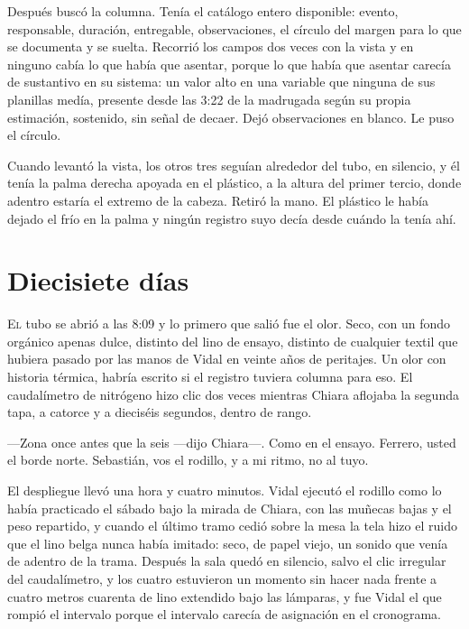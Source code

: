 Después buscó la columna. Tenía el catálogo entero disponible: evento, responsable, duración, entregable, observaciones, el círculo del margen para lo que se documenta y se suelta. Recorrió los campos dos veces con la vista y en ninguno cabía lo que había que asentar, porque lo que había que asentar carecía de sustantivo en su sistema: un valor alto en una variable que ninguna de sus planillas medía, presente desde las 3:22 de la madrugada según su propia estimación, sostenido, sin señal de decaer. Dejó observaciones en blanco. Le puso el círculo.

Cuando levantó la vista, los otros tres seguían alrededor del tubo, en silencio, y él tenía la palma derecha apoyada en el plástico, a la altura del primer tercio, donde adentro estaría el extremo de la cabeza. Retiró la mano. El plástico le había dejado el frío en la palma y ningún registro suyo decía desde cuándo la tenía ahí.

\clearpage

\chapter{Diecisiete días}

\lettrine[lines=2, lhang=0.1, nindent=0.2em]{E}{l} tubo se abrió a las 8:09 y lo primero que salió fue el olor. Seco, con un fondo orgánico apenas dulce, distinto del lino de ensayo, distinto de cualquier textil que hubiera pasado por las manos de Vidal en veinte años de peritajes. Un olor con historia térmica, habría escrito si el registro tuviera columna para eso. El caudalímetro de nitrógeno hizo clic dos veces mientras Chiara aflojaba la segunda tapa, a catorce y a dieciséis segundos, dentro de rango.


---Zona once antes que la seis ---dijo Chiara---. Como en el ensayo. Ferrero, usted el borde norte. Sebastián, vos el rodillo, y a mi ritmo, no al tuyo.

El despliegue llevó una hora y cuatro minutos. Vidal ejecutó el rodillo como lo había practicado el sábado bajo la mirada de Chiara, con las muñecas bajas y el peso repartido, y cuando el último tramo cedió sobre la mesa la tela hizo el ruido que el lino belga nunca había imitado: seco, de papel viejo, un sonido que venía de adentro de la trama. Después la sala quedó en silencio, salvo el clic irregular del caudalímetro, y los cuatro estuvieron un momento sin hacer nada frente a cuatro metros cuarenta de lino extendido bajo las lámparas, y fue Vidal el que rompió el intervalo porque el intervalo carecía de asignación en el cronograma.

